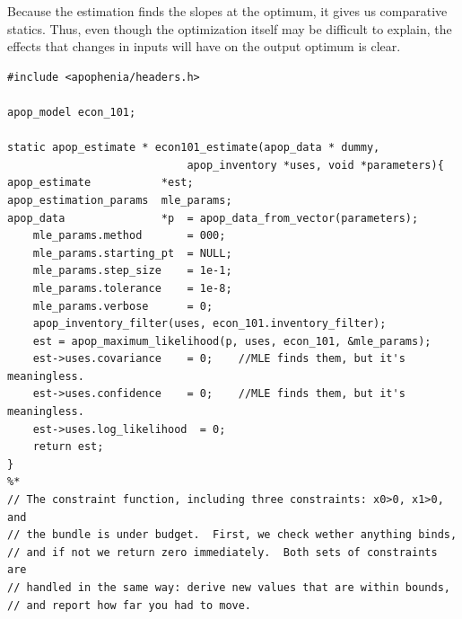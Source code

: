 Because the estimation finds the slopes at the optimum, it gives us
comparative statics. Thus, even though the optimization itself may be
difficult to explain, the effects that changes in inputs will have on
the output optimum is clear.

\begin{lstlisting}
#include <apophenia/headers.h>

apop_model econ_101;

static apop_estimate * econ101_estimate(apop_data * dummy, 
                            apop_inventory *uses, void *parameters){
apop_estimate           *est;
apop_estimation_params  mle_params;
apop_data               *p  = apop_data_from_vector(parameters);
    mle_params.method       = 000;
    mle_params.starting_pt  = NULL;
    mle_params.step_size    = 1e-1;
    mle_params.tolerance    = 1e-8;
    mle_params.verbose      = 0;
    apop_inventory_filter(uses, econ_101.inventory_filter);
    est = apop_maximum_likelihood(p, uses, econ_101, &mle_params);
    est->uses.covariance    = 0;    //MLE finds them, but it's meaningless.
    est->uses.confidence    = 0;    //MLE finds them, but it's meaningless.
    est->uses.log_likelihood  = 0;
    return est;
}
%*
// The constraint function, including three constraints: x0>0, x1>0, and
// the bundle is under budget.  First, we check wether anything binds,
// and if not we return zero immediately.  Both sets of constraints are
// handled in the same way: derive new values that are within bounds,
// and report how far you had to move.


\end{lstlisting}
